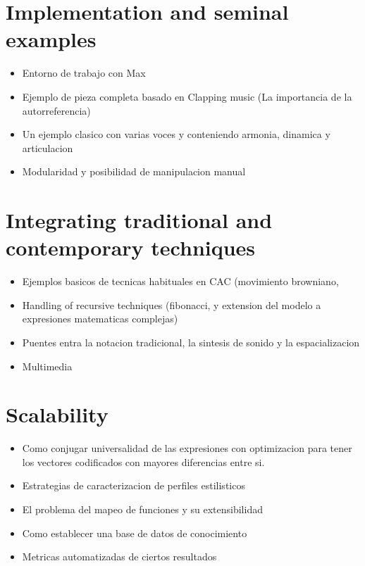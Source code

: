\documentclass{article}
\begin{document}

\section{Implementation and seminal examples}

\begin{itemize}
\item Entorno de trabajo con Max
\item Ejemplo de pieza completa basado en Clapping music (La importancia de la autorreferencia)
\item Un ejemplo clasico con varias voces y conteniendo armonia, dinamica y articulacion
\item Modularidad y posibilidad de manipulacion manual
\end{itemize}



\section{Integrating traditional and contemporary techniques}

\begin{itemize}
\item Ejemplos basicos de tecnicas habituales en CAC (movimiento browniano,
\item Handling of recursive techniques (fibonacci, y extension del modelo a expresiones matematicas complejas)
\item Puentes entra la notacion tradicional, la sintesis de sonido y la espacializacion
\item Multimedia
\end{itemize}




\section{Scalability}
\begin{itemize}
\item Como conjugar universalidad de las expresiones con optimizacion para tener los vectores codificados con mayores diferencias entre si.
\item Estrategias de caracterizacion de perfiles estilisticos
\item El problema del mapeo de funciones y su extensibilidad
\item Como establecer una base de datos de conocimiento
\item Metricas automatizadas de ciertos resultados
\end{itemize}
\end{document}
